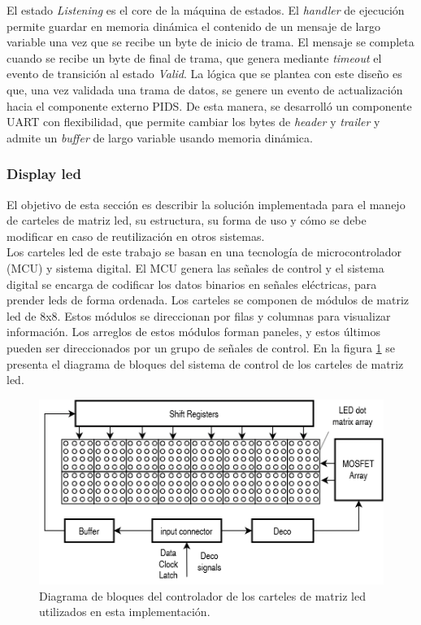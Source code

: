 El estado \textit{Listening} es el core de la máquina de estados. El \textit{handler} de ejecución permite guardar en memoria dinámica el contenido de un mensaje de largo variable una vez que se recibe un byte de inicio de trama.  El mensaje se completa cuando se recibe un byte de final de trama, que genera mediante \textit{timeout} el evento de transición al estado \textit{Valid}. La lógica que se plantea con este diseño es que, una vez validada una trama de datos, se genere un evento de actualización hacia el componente externo PIDS. De esta manera, se desarrolló un componente UART con flexibilidad, que permite cambiar los bytes de \textit{header} y \textit{trailer} y admite un \textit{buffer} de largo variable usando memoria dinámica. \\

\subsubsection{Display led}

El objetivo de esta sección es describir la solución implementada para el manejo de carteles de matriz led, su estructura, su forma de uso y cómo se debe modificar en caso de reutilización en otros sistemas.\\

Los carteles led de este trabajo se basan en una tecnología de microcontrolador (MCU) y sistema digital. El MCU genera las señales de control y el sistema digital se encarga de codificar los datos binarios en señales eléctricas, para prender leds de forma ordenada. Los carteles se componen de módulos de matriz led de 8x8. Estos módulos se direccionan por filas y columnas para  visualizar información. Los arreglos de estos módulos forman paneles, y estos últimos pueden ser direccionados por un grupo de señales de control. En la figura \ref{fig:diagDriverled} se presenta el diagrama de bloques del sistema de control de los carteles de matriz led.\\


\begin{figure}[ht]
	\centering
	\includegraphics[width=1\textwidth]{./Figures/diagDriverled.png}
	\caption{Diagrama de bloques del controlador de los carteles de matriz led utilizados en esta implementación.}
	\label{fig:diagDriverled}
\end{figure}

